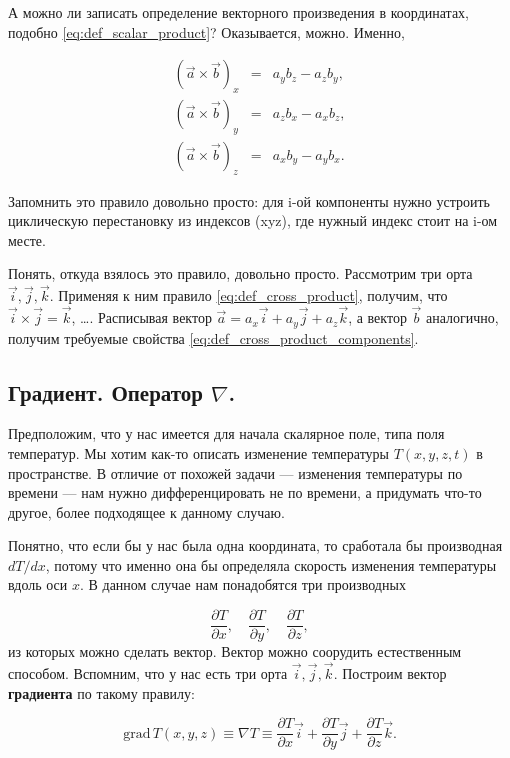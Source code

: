 \documentclass[12pt,a4paper]{article}
\numberwithin{equation}{section}
\numberwithin{equation}{section}
\newcommand{\nn}{\nonumber}
\newcommand{\pt}{\partial}
\newcommand{\grad}{\mathrm{grad}\,}
\begin{document}
А можно ли записать определение векторного произведения в координатах,
подобно \eqref{eq:def_scalar_product}? Оказывается, можно. Именно, 

\begin{eqnarray}
  \label{eq:def_cross_product_components}
  \nn
  (\vec{a} \times \vec{b})_x &=& a_y b_z -a_z b_y,\\
  (\vec{a} \times \vec{b})_y &=& a_z b_x -a_x b_z,\\
  \nn
  (\vec{a} \times \vec{b})_z &=& a_x b_y -a_y b_x.
\end{eqnarray}

Запомнить это правило довольно просто: для i-ой компоненты нужно
устроить циклическую перестановку из индексов (xyz), где нужный индекс
стоит на i-ом месте. 

Понять, откуда взялось это правило, довольно просто. Рассмотрим три
орта $\vec{i},\vec{j},\vec{k}$. Применяя к ним правило
\eqref{eq:def_cross_product}, получим, что $\vec{i} \times \vec{j} =
\vec{k}$, \ldots. Расписывая вектор $\vec{a} = a_x \vec{i} + a_y
\vec{j} + a_z \vec{k}$, а вектор $\vec{b}$ аналогично, получим
требуемые свойства \eqref{eq:def_cross_product_components}. 

\subsection{Градиент. Оператор $\nabla$.}
\label{sec:gradient}

Предположим, что у нас имеется для начала скалярное поле, типа поля
температур. Мы хотим как-то описать изменение температуры $T(x,y,z,t)$
в пространстве. В отличие от похожей задачи --- изменения температуры
по времени --- нам нужно дифференцировать не по времени, а придумать
что-то другое, более подходящее к данному случаю.

Понятно, что если бы у нас была одна координата, то сработала бы
производная $dT/dx$, потому что именно она бы определяла скорость
изменения температуры вдоль оси $x$. В данном случае нам понадобятся
три производных 

\begin{equation}
  \label{eq:def_grad_1}
  \frac{\pt T}{\pt x}, \quad   \frac{\pt T}{\pt y}, \quad   \frac{\pt
    T}{\pt z},
\end{equation}
из которых можно сделать вектор. Вектор можно соорудить естественным
способом. Вспомним, что у нас есть три орта
$\vec{i},\vec{j},\vec{k}$. Построим вектор \textbf{градиента} по такому
правилу:

\begin{equation}
  \label{eq:def_grad_2}
  \grad T (x,y,z) \equiv \nabla T \equiv \frac{\pt T}{\pt x} \vec{i} +  \frac{\pt T}{\pt y}
  \vec{j} +  \frac{\pt T}{\pt z} \vec{k}.
\end{equation}
\end{document}
